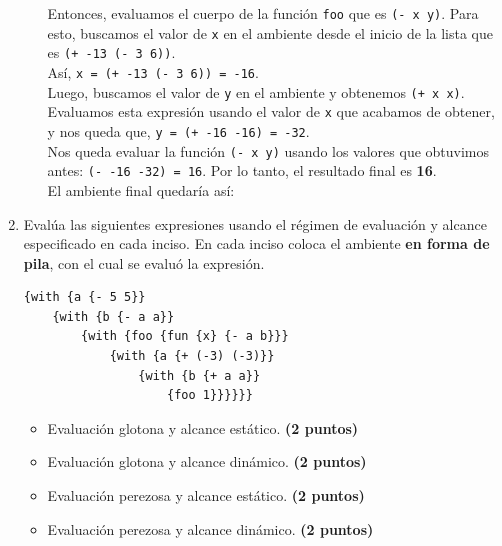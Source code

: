 \documentclass[11pt]{article}
\begin{document}
\begin{enumerate}[leftmargin=0.8cm]
\begin{itemize}
            Entonces, evaluamos el cuerpo de la función \texttt{foo} que es \texttt{(- x y)}. Para esto, buscamos el valor de \texttt{x} en el ambiente desde el inicio de la lista que es \texttt{(+ -13 (- 3 6))}.\\
            Así, \texttt{x = (+ -13 (- 3 6)) = -16}.\\
            Luego, buscamos el valor de \texttt{y} en el ambiente y obtenemos \texttt{(+ x x)}. Evaluamos esta expresión usando el valor de \texttt{x} que acabamos de obtener, y nos queda que, \texttt{y = (+ -16 -16) = -32}.\\
            Nos queda evaluar la función \texttt{(- x y)} usando los valores que obtuvimos antes: \texttt{(- -16 -32) = 16}. Por lo tanto, el resultado final es \textbf{16}.\\
            El ambiente final quedaría así:\\
            \hspace*{-1cm}
    \end{itemize}
    \item Evalúa las siguientes expresiones usando el régimen de evaluación y alcance especificado en cada inciso. En cada inciso coloca el ambiente \textbf{en forma de pila}, con el cual se evaluó la expresión.
    \begin{lstlisting}
{with {a {- 5 5}}
    {with {b {- a a}}
        {with {foo {fun {x} {- a b}}}
            {with {a {+ (-3) (-3)}}
                {with {b {+ a a}}
                    {foo 1}}}}}}
    \end{lstlisting}
    \begin{itemize}
        \item Evaluación glotona y alcance estático. \textbf{(2 puntos)}
        \item Evaluación glotona y alcance dinámico. \textbf{(2 puntos)}
        \item Evaluación perezosa y alcance estático. \textbf{(2 puntos)}
        \item Evaluación perezosa y alcance dinámico. \textbf{(2 puntos)}
    \end{itemize}
\end{enumerate}
\end{document}
